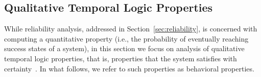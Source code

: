 



\subsection{Qualitative Temporal Logic Properties}
\label{sec:behavior}
 
While reliability analysis, addressed in Section~\ref{sec:reliability}, is concerned with computing a quantitative property (i.e.,  the probability of eventually reaching success states of a system), in this section we focus on analysis of qualitative temporal logic properties, that is, properties that the system satisfies with certainty~\cite{BAIER199871}. In what follows, we refer to such properties as behavioral properties.




